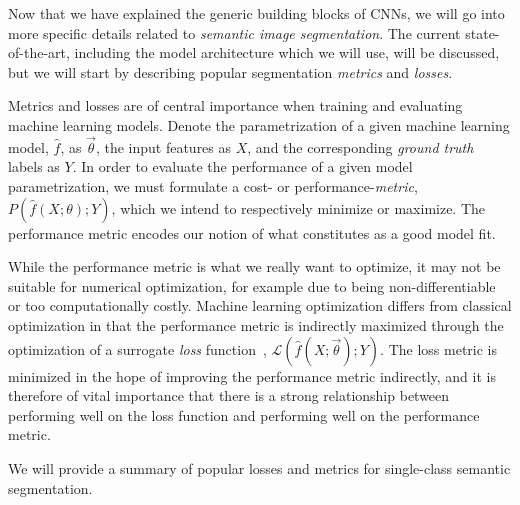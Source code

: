 Now that we have explained the generic building blocks of CNNs, we will go into more specific details related to \emph{semantic image segmentation}.
The current state-of-the-art, including the model architecture which we will use, will be discussed, but we will start by describing popular segmentation \emph{metrics} and \emph{losses}.

Metrics and losses are of central importance when training and evaluating machine learning models.
Denote the parametrization of a given machine learning model, $\hat{f}$, as $\vec{\theta}$, the input features as $X$, and the corresponding \textit{ground truth} labels as $Y$.
In order to evaluate the performance of a given model parametrization, we must formulate a cost- or performance-\textit{metric}, $P(\hat{f}(X; \theta); Y)$, which we intend to respectively minimize or maximize.
The performance metric encodes our notion of what constitutes as a good model fit.

While the performance metric is what we really want to optimize, it may not be suitable for numerical optimization, for example due to being non-differentiable or too computationally costly.
Machine learning optimization differs from classical optimization in that the performance metric is indirectly maximized through the optimization of a surrogate \textit{loss} function~\cite[p.~272]{goodfellow}, $\mathcal{L}(\hat{f}(X; \vec{\theta});  Y)$.
The loss metric is minimized in the hope of improving the performance metric indirectly, and it is therefore of vital importance that there is a strong relationship between performing well on the loss function and performing well on the performance metric.

We will provide a summary of popular losses and metrics for single-class semantic segmentation.
